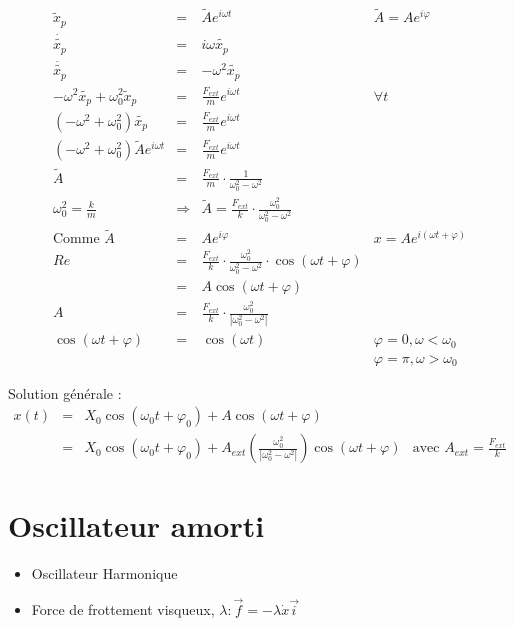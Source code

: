 \[\begin{array}{rccl}
		\tilde{x}_p &=& \tilde{A}e^{i\omega t} &\tilde{A} = A e^{i\varphi} \\
		\dot{\tilde{x_p}} &=& i \omega \tilde{x_p} \\
		\ddot{\tilde{x_p}} &=& -\omega^2 \tilde{x_p} \\
		-\omega^2 \tilde{x_p}+\omega_0^2\tilde{x}_p &=& \frac{F_{ext}}{m}e^{i\omega t} & \forall t \\
		(-\omega^2 + \omega_0^2)\tilde{x_p} &=& \frac{F_{ext}}{m} e^{i\omega t} \\
		(-\omega^2 + \omega_0^2) \tilde{A}e^{i\omega t} &=& \frac{F_{ext}}{m}e^{i\omega t} \\
		\tilde{A} &=& \frac{F_{ext}}{m} \cdot \frac{1}{\omega_0^2 - \omega^2} \\
		\omega_0^2 = \frac{k}{m} & \Rightarrow & \tilde{A} = \frac{F_{ext}}{k}\cdot \frac{\omega_0^2}{\omega_0^2 - \omega^2} \\
		\text{Comme } \tilde{A} &=& Ae^{i\varphi} &  x = Ae^{i(\omega t + \varphi)}\\
		Re &=& \frac{F_{ext}}{k} \cdot \frac{\omega_0^2}{\omega_0^2 - \omega^2} \cdot \cos(\omega t + \varphi)\\
		   &=& A \cos(\omega t + \varphi) \\
		A &=&\frac{F_{ext}}{k} \cdot \frac{\omega_0^2}{|\omega_0^2 - \omega^2|} \\
		\cos(\omega t + \varphi) &=& \cos(\omega t) & \varphi = 0, \omega < \omega_0 \\
																					   &&& \varphi = \pi, \omega > \omega_0 \end{array}\]

		Solution générale :
		\[\begin{array}{rclr}
				x(t) &=& X_0\cos(\omega_0 t + \varphi_0) + A\cos(\omega t + \varphi) \\
						   &=& X_0\cos(\omega_0 t + \varphi_0) + A_{ext}(\frac{\omega_0^2}{|\omega_0^2 - \omega^2|}) \cos(\omega t + \varphi)& \text{avec } A_{ext} = \frac{F_{ext}}{k}
			\end{array}\]

	\section{Oscillateur amorti}

	\begin{itemize}
		\item Oscillateur Harmonique
		\item Force de frottement visqueux, $\lambda : \vec{f} = - \lambda \dot{x}\vec{i}$
	\end{itemize}

